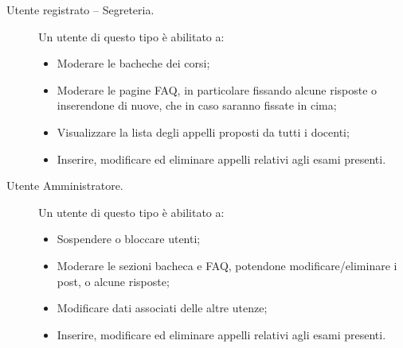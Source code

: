 \documentclass [a4paper,11pt]{book}
\begin{document}
\begin{description}
\item[Utente registrato – Segreteria.] Un utente di questo tipo è abilitato a:

\begin{itemize}
\item Moderare le bacheche dei corsi;
\item Moderare le pagine FAQ, in particolare fissando alcune risposte o inserendone di nuove, che in caso saranno fissate in cima;	%
\item Visualizzare la lista degli appelli proposti da tutti i docenti;
\item Inserire, modificare ed eliminare appelli relativi agli esami presenti.
\end{itemize}

\item[Utente Amministratore.] Un utente di questo tipo è abilitato a:

\begin{itemize}
\item Sospendere o bloccare utenti;
\item Moderare le sezioni bacheca e FAQ, potendone modificare/eliminare i post, o alcune risposte;
\item Modificare dati associati delle altre utenze;
\item Inserire, modificare ed eliminare appelli relativi agli esami presenti.
\end{itemize}
\end{description}

\medskip
\medskip
\end{document}
